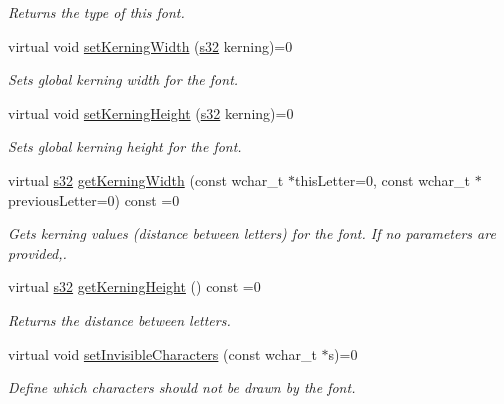 \begin{DoxyCompactItemize}
\begin{DoxyCompactList}\small\item\em Returns the type of this font. \end{DoxyCompactList}\item 
\mbox{\label{classirr_1_1gui_1_1IGUIFont_aa683bb2535776b7f81adc050931d9b17}} 
virtual void \hyperlink{classirr_1_1gui_1_1IGUIFont_aa683bb2535776b7f81adc050931d9b17}{set\+Kerning\+Width} (\hyperlink{namespaceirr_ac66849b7a6ed16e30ebede579f9b47c6}{s32} kerning)=0
\begin{DoxyCompactList}\small\item\em Sets global kerning width for the font. \end{DoxyCompactList}\item 
\mbox{\label{classirr_1_1gui_1_1IGUIFont_a9545ecfae06592acd47508f6824bb386}} 
virtual void \hyperlink{classirr_1_1gui_1_1IGUIFont_a9545ecfae06592acd47508f6824bb386}{set\+Kerning\+Height} (\hyperlink{namespaceirr_ac66849b7a6ed16e30ebede579f9b47c6}{s32} kerning)=0
\begin{DoxyCompactList}\small\item\em Sets global kerning height for the font. \end{DoxyCompactList}\item 
virtual \hyperlink{namespaceirr_ac66849b7a6ed16e30ebede579f9b47c6}{s32} \hyperlink{classirr_1_1gui_1_1IGUIFont_a7de0b25d3d1dbdcc9036e5d788e2d9ab}{get\+Kerning\+Width} (const wchar\+\_\+t $\ast$this\+Letter=0, const wchar\+\_\+t $\ast$previous\+Letter=0) const =0
\begin{DoxyCompactList}\small\item\em Gets kerning values (distance between letters) for the font. If no parameters are provided,. \end{DoxyCompactList}\item 
\mbox{\label{classirr_1_1gui_1_1IGUIFont_a1f1a760be155fc0f6a632b457154a5d8}} 
virtual \hyperlink{namespaceirr_ac66849b7a6ed16e30ebede579f9b47c6}{s32} \hyperlink{classirr_1_1gui_1_1IGUIFont_a1f1a760be155fc0f6a632b457154a5d8}{get\+Kerning\+Height} () const =0
\begin{DoxyCompactList}\small\item\em Returns the distance between letters. \end{DoxyCompactList}\item 
virtual void \hyperlink{classirr_1_1gui_1_1IGUIFont_acff05412dc954845add611c5f71cef49}{set\+Invisible\+Characters} (const wchar\+\_\+t $\ast$s)=0
\begin{DoxyCompactList}\small\item\em Define which characters should not be drawn by the font. \end{DoxyCompactList}\end{DoxyCompactItemize}
